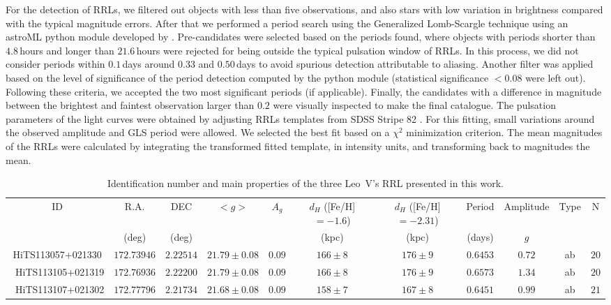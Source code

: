 \documentclass[iop]{emulateapj}
\begin{document}
For the detection of RRLs, we filtered out objects with less than five observations, and also stars with low variation in brightness compared with the typical magnitude errors. 
After that we performed a period search using the Generalized Lomb-Scargle technique \citep[GLS;][]{Zech09} using an astroML python module developed by \citet{Vander12}. 
Pre-candidates were selected based on the periods found, where objects with periods shorter than $4.8$\,hours and longer than $21.6$\,hours were rejected for being outside the typical pulsation window of RRLs. 
In this process, we did not consider periods within $0.1$\,days around $0.33$ and $0.50$\,days to avoid spurious detection attributable to aliasing. 
Another filter was applied based on the level of significance of the period detection computed by the python module (statistical significance $< 0.08$ were left out). 
Following these criteria, we accepted the two most significant periods (if applicable). 
Finally, the candidates with a difference in magnitude between the brightest and faintest observation larger than $0.2$ were visually inspected to make the final catalogue. 
The pulsation parameters of the light curves were obtained by adjusting RRLs templates from SDSS Stripe 82 \citep{Sesar2010}. 
For this fitting, small variations around the observed amplitude and GLS period were allowed. 
We selected the best fit based on a $\chi^2$ minimization criterion. 
The mean magnitudes of the RRLs were calculated by integrating the transformed fitted template, in intensity units, and transforming back to magnitudes the mean.

\begin{table*}[t]\scriptsize
\caption{Identification number and main properties of the three Leo~V's RRL presented in this work.}
\label{tab:RRL}
\begin{center}
\begin{tabular}{c c c c c c c c c c c}
\hline
\hline
	ID &  R.A.  &  DEC  &  $<g>$ & $A_g$  &  $d_H$ ([Fe/H]$=-1.6$) &  $d_H$ ([Fe/H]$=-2.31$)& Period  & Amplitude  & Type  &  N\\
	 &  (deg)  &  (deg)  &    &    & (kpc) & (kpc)   & (days) & $g$ &  &  \\
\hline 
HiTS113057+021330 &	$172.73946$	&   $2.22514$  & $21.79 \pm 0.08$ & $0.09$ & $166\pm 8$ & $176\pm 9$  & $0.6453$ & $0.72$ & ab &  $20$\\\
HiTS113105+021319 &	$172.76936$	&   $2.22200$  & $21.79 \pm 0.08$ & $0.09$ & $166\pm8$ & $176\pm9$  & $0.6573$ & $1.34$ & ab &  $20$\\\
HiTS113107+021302 &	$172.77796$ &	$2.21734$  & $21.68 \pm 0.08$ & $0.09$ & $158\pm7$ & $167\pm8$  & $0.6451$ & $0.99$ & ab &  $21$\\
\hline
\end{tabular} 
\end{center}
\end{table*}
\end{document}
